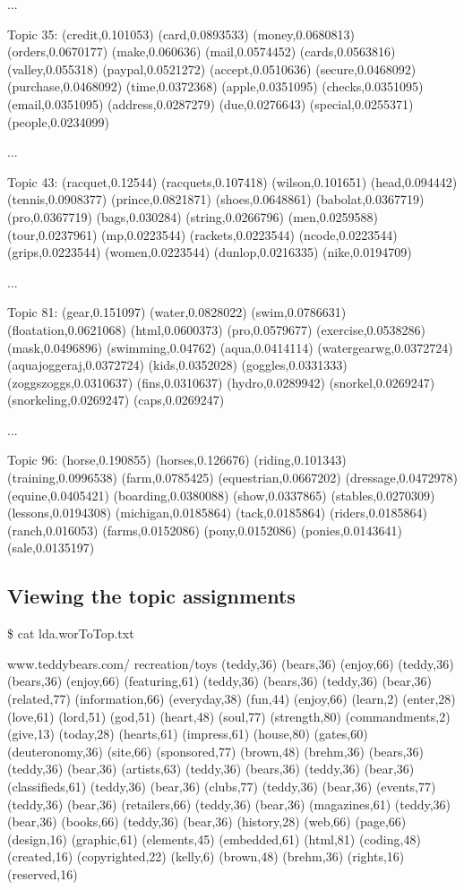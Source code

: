 {\ttfamily ... }

{\ttfamily Topic 35: (credit,0.101053) (card,0.0893533) (money,0.0680813) (orders,0.0670177) (make,0.060636) (mail,0.0574452) (cards,0.0563816) (valley,0.055318) (paypal,0.0521272) (accept,0.0510636) (secure,0.0468092) (purchase,0.0468092) (time,0.0372368) (apple,0.0351095) (checks,0.0351095) (email,0.0351095) (address,0.0287279) (due,0.0276643) (special,0.0255371) (people,0.0234099) }

{\ttfamily ... }

{\ttfamily Topic 43: (racquet,0.12544) (racquets,0.107418) (wilson,0.101651) (head,0.094442) (tennis,0.0908377) (prince,0.0821871) (shoes,0.0648861) (babolat,0.0367719) (pro,0.0367719) (bags,0.030284) (string,0.0266796) (men,0.0259588) (tour,0.0237961) (mp,0.0223544) (rackets,0.0223544) (ncode,0.0223544) (grips,0.0223544) (women,0.0223544) (dunlop,0.0216335) (nike,0.0194709) }

{\ttfamily ... }

{\ttfamily Topic 81: (gear,0.151097) (water,0.0828022) (swim,0.0786631) (floatation,0.0621068) (html,0.0600373) (pro,0.0579677) (exercise,0.0538286) (mask,0.0496896) (swimming,0.04762) (aqua,0.0414114) (watergearwg,0.0372724) (aquajoggeraj,0.0372724) (kids,0.0352028) (goggles,0.0331333) (zoggszoggs,0.0310637) (fins,0.0310637) (hydro,0.0289942) (snorkel,0.0269247) (snorkeling,0.0269247) (caps,0.0269247)  }

{\ttfamily ... }

{\ttfamily Topic 96: (horse,0.190855) (horses,0.126676) (riding,0.101343) (training,0.0996538) (farm,0.0785425) (equestrian,0.0667202) (dressage,0.0472978) (equine,0.0405421) (boarding,0.0380088) (show,0.0337865) (stables,0.0270309) (lessons,0.0194308) (michigan,0.0185864) (tack,0.0185864) (riders,0.0185864) (ranch,0.016053) (farms,0.0152086) (pony,0.0152086) (ponies,0.0143641) (sale,0.0135197) } \hypertarget{single__machine__usage_topic_mix}{}\subsection{Viewing the topic assignments}\label{single__machine__usage_topic_mix}
{\ttfamily  }

{\ttfamily \$ cat lda.worToTop.txt }

{\ttfamily www.teddybears.com/ recreation/toys (teddy,36) (bears,36) (enjoy,66) (teddy,36) (bears,36) (enjoy,66) (featuring,61) (teddy,36) (bears,36) (teddy,36) (bear,36) (related,77) (information,66) (everyday,38) (fun,44) (enjoy,66) (learn,2) (enter,28) (love,61) (lord,51) (god,51) (heart,48) (soul,77) (strength,80) (commandments,2) (give,13) (today,28) (hearts,61) (impress,61) (house,80) (gates,60) (deuteronomy,36) (site,66) (sponsored,77) (brown,48) (brehm,36) (bears,36) (teddy,36) (bear,36) (artists,63) (teddy,36) (bears,36) (teddy,36) (bear,36) (classifieds,61) (teddy,36) (bear,36) (clubs,77) (teddy,36) (bear,36) (events,77) (teddy,36) (bear,36) (retailers,66) (teddy,36) (bear,36) (magazines,61) (teddy,36) (bear,36) (books,66) (teddy,36) (bear,36) (history,28) (web,66) (page,66) (design,16) (graphic,61) (elements,45) (embedded,61) (html,81) (coding,48) (created,16) (copyrighted,22) (kelly,6) (brown,48) (brehm,36) (rights,16) (reserved,16)  }

